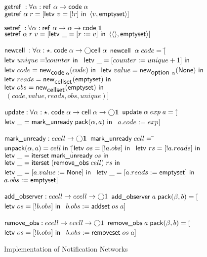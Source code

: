 \documentclass[natbib]{sigplanconf}
\begin{document}
\begin{figure}
{\begin{specification}
$\getref : \forall \alpha : \reftype{\alpha} \to \codetype{\alpha}$ \nextline
$\getref \alpha\;r = \comp{\letv{v}{\comp{!r}}{\pair{v}{\ctext{emptyset}}}}$ 

$\setref : \forall \alpha : \reftype{\alpha} \to \alpha \to \codetype{\unittype}$ \nextline
$\setref \alpha\;r\;v = \comp{\letv{\_}{\comp{r := v}}{\pair{\unit}{\ctext{emptyset}}}}$ 

$\newcell : \forall \alpha:\star.\; \codetype{\alpha} \to \monad{\celltype{\alpha}}$ \nextline
$\newcell\;\alpha\;code = [$\=$\letv{unique}{!counter}{}$ \nextline
                       \>$\letv{\_}{\comp{counter := unique + 1}}{}$ \nextline
                                   \>$\letv{code}{\newref{\codetype{\alpha}}{code}}{}$ \nextline
                                   \>$\letv{value}{\newref{\opttype{\alpha}}{\ctext{None}}}{}$ \nextline
                                   \>$\letv{reads}{\newref{\cellset}{\ctext{emptyset}}}{}$ \nextline
                                   \>$\letv{obs}{\newref{\cellset}{\ctext{emptyset}}}{}$ \nextline
                                   \>$\; (code, value, reads, obs, unique)]$ 

$\updatecell : \forall \alpha:\star.\; \codetype{\alpha} \to \celltype{\alpha} \to \monad{\unittype}$\nextline
$\updatecell\;\alpha\;exp\;a = 
     [$\=$\letv{\_}{\ctext{mark\_unready}\;\pack{\alpha}{a}}{}$ \nextline
       \>$a.code := exp]$ 

$\ctext{mark\_unready} : ecell \to \monad{\unittype}$ \nextline
$\ctext{mark\_unready}\;cell =\; $\=$\ctext{unpack}(\alpha, a) = cell\; \ctext{in}$\nextline
\>  $[$\=$\letv{os}{\comp{!a.obs}}{}$ \nextline
\>     \>$\letv{rs}{\comp{!a.reads}}{}$ \nextline
\>     \>$\letv{\_}{\ctext{iterset}\;\ctext{mark\_unready}\;os}{}$ \nextline
\>     \>$\letv{\_}{\ctext{iterset}\;(\ctext{remove\_obs}\;cell)\;rs}{}$ \nextline
\>     \>$\letv{\_}{\comp{a.value := \ctext{None}}}{}$ \nextline
\>     \>$\letv{\_}{\comp{a.reads := \ctext{emptyset}}}{}$ \nextline
\>     \>$a.obs   := \ctext{emptyset}]$ \nextline[0.5em]

$\ctext{add\_observer} : ecell  \to ecell \to \monad{1}$\nextline
$\ctext{add\_observer}\;a\;\pack{\beta}{b} = [$\=
 $\letv{os}{\comp{!b.obs}}{}$ \nextline
\> $b.obs := \addset\;os\;a]$ \nextline[0.5em]

$\ctext{remove\_obs} : ecell \to ecell \to \monad{1}$\nextline
$\ctext{remove\_obs}\; a\;\pack{\beta}{b} = [$\=
  $\letv{os}{\comp{!b.obs}}{}$ \nextline
\>$b.obs := \ctext{removeset}\;os\;a]$ 
\end{specification}
}
\caption{Implementation of Notification Networks}
\label{notification-implementation}
\end{figure}
\end{document}
